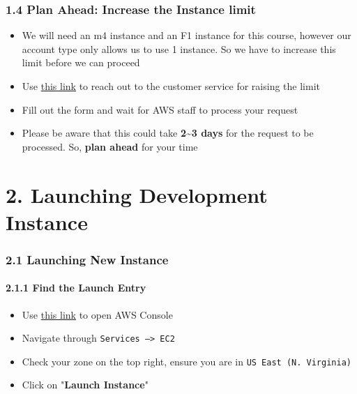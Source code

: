 \documentclass[]{article}
\let\oldparagraph\paragraph
\renewcommand{\paragraph}[1]{\oldparagraph{#1}\mbox{}}
\begin{document}
\hypertarget{header-n79}{%
\subsubsection{1.4 Plan Ahead: Increase the Instance
limit}\label{header-n79}}

\begin{itemize}
\item
  We will need an m4 instance and an F1 instance for this course,
  however our account type only allows us to use 1 instance. So we have
  to increase this limit before we can proceed
\item
  Use
  \href{https://console.aws.amazon.com/support/v1\#/case/create}{this
  link} to reach out to the customer service for raising the limit
\item
  Fill out the form and wait for AWS staff to process your request
\item
  Please be aware that this could take \textbf{2\textasciitilde{}3 days}
  for the request to be processed. So, \textbf{plan ahead} for your time
\end{itemize}

\hypertarget{header-n96}{%
\section{2. Launching Development Instance}\label{header-n96}}

\hypertarget{header-n97}{%
\subsubsection{2.1 Launching New Instance}\label{header-n97}}

\hypertarget{header-n98}{%
\paragraph{2.1.1 Find the Launch Entry}\label{header-n98}}

\begin{itemize}
\item
  Use \href{https://console.aws.amazon.com/}{this link} to open AWS
  Console
\item
  Navigate through \texttt{Services\ —\textgreater{}\ EC2} 
\item
  Check your zone on the top right, ensure you are in
  \texttt{US\ East\ (N.\ Virginia)}
\item
  Click on "\textbf{Launch Instance}"
\end{itemize}
\end{document}
